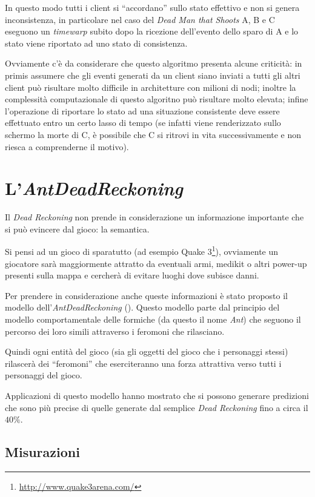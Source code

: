 \documentclass[a4paper,11pt]{article}
\begin{document}
In questo modo tutti i client si ``accordano'' sullo stato effettivo e non si genera inconsistenza, in particolare nel caso del \emph{Dead Man that Shoots} A, B e C eseguono un \emph{timewarp} subito dopo la ricezione dell'evento dello sparo di A e lo stato viene riportato ad uno stato di consistenza.

Ovviamente c'\`e da considerare che questo algoritmo presenta alcune criticit\`a: in primis assumere che gli eventi generati da un client siano inviati a tutti gli altri client pu\`o risultare molto difficile in architetture con milioni di nodi; inoltre la complessit\`a computazionale di questo algoritno pu\`o risultare molto elevata; infine l'operazione di riportare lo stato ad una situazione consistente deve essere effettuato entro un certo lasso di tempo (se infatti viene renderizzato sullo schermo la morte di C, \`e possibile che C si ritrovi in vita successivamente e non riesca a comprenderne il motivo).

\section{L'\emph{AntDeadReckoning}}

Il \emph{Dead Reckoning} non prende in considerazione un informazione importante che si pu\`o evincere dal gioco: la semantica.

Si pensi ad un gioco di sparatutto (ad esempio Quake 3\footnote{\url{http://www.quake3arena.com/}}), ovviamente un giocatore sar\`a maggiormente attratto da eventuali armi, medikit o altri power-up presenti sulla mappa e cercher\`a di evitare luoghi dove subisce danni.

Per prendere in considerazione anche queste informazioni \`e stato proposto il modello dell'\emph{AntDeadReckoning} (\cite{rif5}). Questo modello parte dal principio del modello comportamentale delle formiche (da questo il nome \emph{Ant}) che seguono il percorso dei loro simili attraverso i feromoni che rilasciano.

Quindi ogni entit\`a del gioco (sia gli oggetti del gioco che i personaggi stessi) rilascer\`a dei ``feromoni'' che eserciteranno una forza attrattiva verso tutti i personaggi del gioco.

Applicazioni di questo modello hanno mostrato che si possono generare predizioni che sono pi\`u precise di quelle generate dal semplice \emph{Dead Reckoning} fino a circa il $40\%$.

\subsection{Misurazioni}
\end{document}
